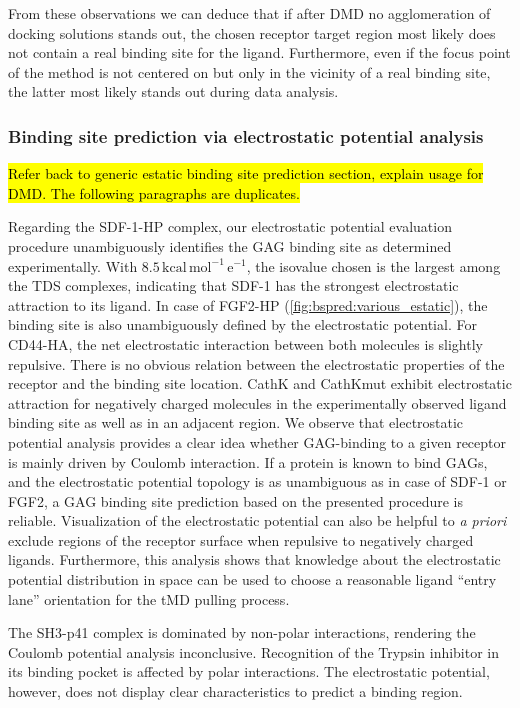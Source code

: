 From these observations we can deduce that if after DMD no agglomeration of
docking solutions stands out, the chosen receptor target region most likely does
not contain a real binding site for the ligand. Furthermore, even if the focus
point of the method is not centered on but only in the vicinity of a real
binding site, the latter most likely stands out during data analysis.


\subsubsection{Binding site prediction via electrostatic potential analysis}

\hl{Refer back to generic estatic binding site prediction section, explain usage for
DMD. The following paragraphs are duplicates.}

Regarding the SDF-1-HP complex, our electrostatic potential evaluation procedure
unambiguously identifies the GAG binding site as determined experimentally. With
$8.5\,\mathrm{kcal\,mol^{-1}\,e^{-1}}$, the isovalue chosen is the largest among
the TDS complexes, indicating that SDF-1 has the strongest electrostatic
attraction to its ligand. In case of FGF2-HP
(\cref{fig:bspred:various_estatic}), the binding site is also unambiguously
defined by the electrostatic potential. For CD44-HA, the net electrostatic
interaction between both molecules is slightly repulsive. There is no obvious
relation between the electrostatic properties of the receptor and the binding
site location. CathK and CathKmut exhibit electrostatic attraction for
negatively charged molecules in the experimentally observed ligand binding site
as well as in an adjacent region. We observe that electrostatic potential
analysis provides a clear idea whether GAG-binding to a given receptor is mainly
driven by Coulomb interaction. If a protein is known to bind GAGs, and the
electrostatic potential topology is as unambiguous as in case of SDF-1 or FGF2,
a GAG binding site prediction based on the presented procedure is reliable.
Visualization of the electrostatic potential can also be helpful to \textit{a
priori} exclude regions of the receptor surface when repulsive to negatively
charged ligands. Furthermore, this analysis shows that knowledge about the
electrostatic potential distribution in space can be used to choose a reasonable
ligand \enquote{entry lane} orientation for the tMD pulling process.


The SH3-p41 complex is dominated by non-polar interactions, rendering the
Coulomb potential analysis inconclusive. Recognition of the Trypsin inhibitor in
its  binding pocket is affected by polar interactions. The electrostatic
potential, however, does not display clear characteristics to predict a binding
region.

